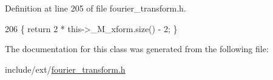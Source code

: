 Definition at line 205 of file fourier\+\_\+transform.\+h.


\begin{DoxyCode}
206       \{ \textcolor{keywordflow}{return} 2 * this->\_M\_xform.size() - 2; \}
\end{DoxyCode}


The documentation for this class was generated from the following file\+:\begin{DoxyCompactItemize}
\item 
include/ext/\hyperlink{fourier__transform_8h}{fourier\+\_\+transform.\+h}\end{DoxyCompactItemize}
